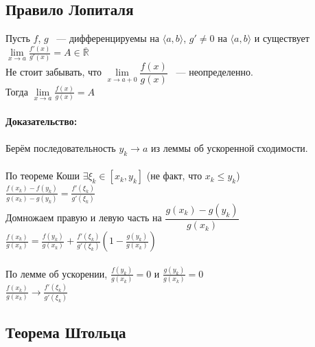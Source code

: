 \documentclass[../main.tex]{subfiles}
\begin{document}
\newpage


\subsection{Правило Лопиталя}
Пусть $f$, $g$ ~--- дифференцируемы на $\langle a, b \rangle$, $g' \neq 0$ на $\langle a, b \rangle$ и существует $\lim\limits_{x \rightarrow a} \frac{f'(x)}{g'(x)} = A \in \overline{\mathbb{R}}$\\
Не стоит забывать, что $\lim\limits_{x \rightarrow a + 0} \dfrac{f(x)}{g(x)}$ ~--- неопределенно.\\
Тогда $\lim\limits_{x \rightarrow a} \frac{f(x)}{g(x)} = A$\\\\
\textbf{Доказательство:}\\\\
Берём последовательность $y_k \rightarrow a$ из леммы об ускоренной сходимости. \\\\
По теореме Коши $\exists \xi_k \in [x_k, y_k]$ (не факт, что $x_k \leq y_k$)\\
$\frac{f(x_k) - f(y_k)}{g(x_k) - g(y_k)} = \frac{f'(\xi_k)}{g'(\xi_k)}$\\
Домножаем правую и левую часть на $\dfrac{g(x_k) - g(y_k)}{g(x_k)}$\\
$\frac{f(x_k)}{g(x_k)} = \frac{f(y_k)}{g(x_k)} + \frac{f'(\xi_k)}{g'(\xi_k)} \left( 1 - \frac{g(y_k)}{g(x_k)} \right)$\\\\
По лемме об ускорении, $\frac{f(y_k)}{g(x_k)} = 0$ и $\frac{g(y_k)}{g(x_k)} = 0$\\
$\frac{f(x_k)}{g(x_k)} \rightarrow \frac{f'(\xi_k)}{g'(\xi_k)}$\\
\newpage


\subsection{Теорема Штольца}
\end{document}
